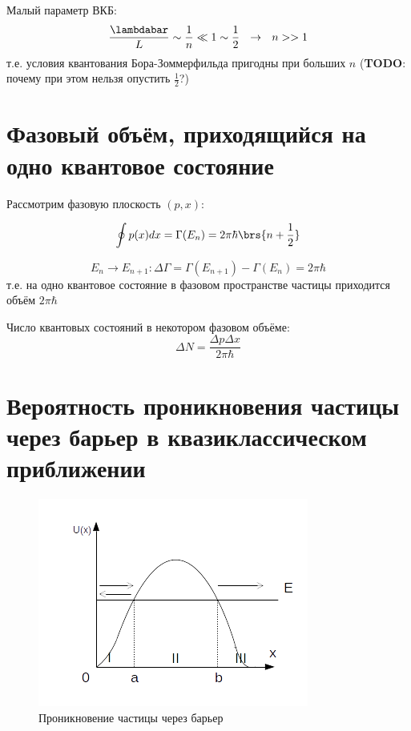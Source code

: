 Малый параметр ВКБ:
$$
\frac{\lambdabar}{L} \sim \frac{1}{n} \ll 1 \sim \frac{1}{2} ~~\rightarrow~~ n >> 1
$$
т.е. условия квантования Бора-Зоммерфильда пригодны при больших $n$ (\textbf{TODO}: почему при этом нельзя опустить $\frac{1}{2}$?)

\section{Фазовый объём, приходящийся на одно квантовое состояние}

Рассмотрим фазовую плоскость $(p,x)$:

$$
\oint p(x)dx = \Gamma(E_n) = 2\pi\hbar\brs{n+\frac{1}{2}}
$$

$$
E_n \to E_{n+1}: \boxed{\Delta\Gamma = \Gamma(E_{n+1}) - \Gamma(E_n) = 2\pi\hbar}
$$
т.е. на одно квантовое состояние в фазовом пространстве частицы приходится объём $2\pi\hbar$

Число квантовых состояний в некотором фазовом объёме:
$$
\boxed{\Delta N = \frac{\Delta p \Delta x}{2\pi\hbar}}
$$

\begin{sloppypar}
  \section{Вероятность проникновения частицы через барьер в квазиклассическом приближении}
\end{sloppypar}

\begin{figure}[h]
\centering
\includegraphics[scale=1]{figs/11_5}
\caption{Проникновение частицы через барьер}
\label{fig:11_5}
\end{figure}


